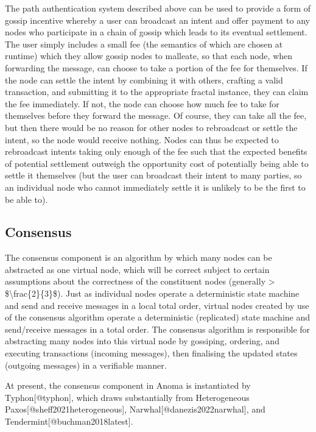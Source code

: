 The path authentication system described above can be used to provide a
form of gossip incentive whereby a user can broadcast an intent and
offer payment to any nodes who participate in a chain of gossip which
leads to its eventual settlement. The user simply includes a small fee
(the semantics of which are chosen at runtime) which they allow gossip
nodes to malleate, so that each node, when forwarding the message, can
choose to take a portion of the fee for themselves. If the node can
settle the intent by combining it with others, crafting a valid
transaction, and submitting it to the appropriate fractal instance, they
can claim the fee immediately. If not, the node can choose how much fee
to take for themselves before they forward the message. Of course, they
can take all the fee, but then there would be no reason for other nodes
to rebroadcast or settle the intent, so the node would receive nothing.
Nodes can thus be expected to rebroadcast intents taking only enough of
the fee such that the expected benefits of potential settlement outweigh
the opportunity cost of potentially being able to settle it themselves
(but the user can broadcast their intent to many parties, so an
individual node who cannot immediately settle it is unlikely to be the
first to be able to).

\subsection{Consensus}\label{consensus-1}

The consensus component is an algorithm by which many nodes can be
abstracted as one virtual node, which will be correct subject to certain
assumptions about the correctness of the constituent nodes (generally
\textgreater{} \$\textbackslash frac\{2\}\{3\}\$). Just as individual
nodes operate a deterministic state machine and send and receive
messages in a local total order, virtual nodes created by use of the
consensus algorithm operate a deterministic (replicated) state machine
and send/receive messages in a total order. The consensus algorithm is
responsible for abstracting many nodes into this virtual node by
gossiping, ordering, and executing transactions (incoming messages),
then finalising the updated states (outgoing messages) in a verifiable
manner.

At present, the consensus component in Anoma is instantiated by
Typhon{[}@typhon{]}, which draws substantially from Heterogeneous
Paxos{[}@sheff2021heterogeneous{]}, Narwhal{[}@danezis2022narwhal{]},
and Tendermint{[}@buchman2018latest{]}.

